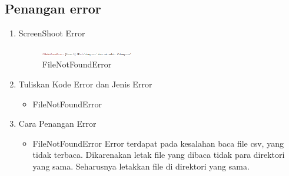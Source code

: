\subsection{Penangan error}
\begin{enumerate}
	\item ScreenShoot Error
	\begin{figure}[H]
		\includegraphics[width=4cm]{figures/1164013/err/4_file_not_found.png}
		\centering
		\caption{FileNotFoundError}
	\end{figure}
	\item Tuliskan Kode Error dan Jenis Error
	\begin{itemize}
		\item FileNotFoundError
	\end{itemize}
	\item Cara Penangan Error
	\begin{itemize}
		\item FileNotFoundError
		\hfill\break
		Error terdapat pada kesalahan baca file csv, yang tidak terbaca. Dikarenakan letak file yang dibaca tidak para direktori yang sama. Seharusnya letakkan file di direktori yang sama. 
	\end{itemize}
\end{enumerate}

